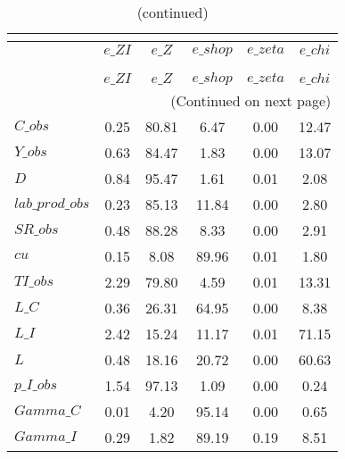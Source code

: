  
\begin{center}
\begin{longtable}{lccccc} 
\caption{VARIANCE DECOMPOSITION (in percent)}\\
 \label{Table:th_var_decomp_uncond}\\
\toprule 
$                $	 & 	 $     e\_ZI$	 & 	 $      e\_Z$	 & 	 $   e\_shop$	 & 	 $   e\_zeta$	 & 	 $    e\_chi$\\
\midrule \endfirsthead 
\caption{(continued)}\\
 \toprule \\ 
$                $	 & 	 $     e\_ZI$	 & 	 $      e\_Z$	 & 	 $   e\_shop$	 & 	 $   e\_zeta$	 & 	 $    e\_chi$\\
\midrule \endhead 
\midrule \multicolumn{6}{r}{(Continued on next page)} \\ \bottomrule \endfoot 
\bottomrule \endlastfoot 
$C\_obs          $	 & 	       0.25	 & 	      80.81	 & 	       6.47	 & 	       0.00	 & 	      12.47 \\ 
$Y\_obs          $	 & 	       0.63	 & 	      84.47	 & 	       1.83	 & 	       0.00	 & 	      13.07 \\ 
$D               $	 & 	       0.84	 & 	      95.47	 & 	       1.61	 & 	       0.01	 & 	       2.08 \\ 
$lab\_prod\_obs  $	 & 	       0.23	 & 	      85.13	 & 	      11.84	 & 	       0.00	 & 	       2.80 \\ 
$SR\_obs         $	 & 	       0.48	 & 	      88.28	 & 	       8.33	 & 	       0.00	 & 	       2.91 \\ 
$cu              $	 & 	       0.15	 & 	       8.08	 & 	      89.96	 & 	       0.01	 & 	       1.80 \\ 
$TI\_obs         $	 & 	       2.29	 & 	      79.80	 & 	       4.59	 & 	       0.01	 & 	      13.31 \\ 
$L\_C            $	 & 	       0.36	 & 	      26.31	 & 	      64.95	 & 	       0.00	 & 	       8.38 \\ 
$L\_I            $	 & 	       2.42	 & 	      15.24	 & 	      11.17	 & 	       0.01	 & 	      71.15 \\ 
$L               $	 & 	       0.48	 & 	      18.16	 & 	      20.72	 & 	       0.00	 & 	      60.63 \\ 
$p\_I\_obs       $	 & 	       1.54	 & 	      97.13	 & 	       1.09	 & 	       0.00	 & 	       0.24 \\ 
$Gamma\_C        $	 & 	       0.01	 & 	       4.20	 & 	      95.14	 & 	       0.00	 & 	       0.65 \\ 
$Gamma\_I        $	 & 	       0.29	 & 	       1.82	 & 	      89.19	 & 	       0.19	 & 	       8.51 \\ 
\end{longtable}
 \end{center}
